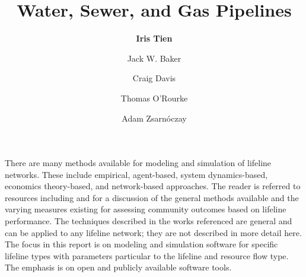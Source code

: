 %
%
%

\title{Water, Sewer, and Gas Pipelines}
\author{
    \textbf{Iris Tien}
    \and {Jack W. Baker}
    \and {Craig Davis}
    \and {Thomas O'Rourke}
    \and {Adam Zsarnóczay}}
\tocauthor{}
%
%
\maketitle

There are many methods available for modeling and simulation of lifeline networks. These include empirical, agent-based, system dynamics-based, economics theory-based, and network-based approaches. The reader is referred to resources including \cite{ouyang2014review} and \cite{johansen2017metrics} for a discussion of the general methods available and the varying measures existing for assessing community outcomes based on lifeline performance. The techniques described in the works referenced are general and can be applied to any lifeline network; they are not described in more detail here. The focus in this report is on modeling and simulation software for specific lifeline types with parameters particular to the lifeline and resource flow type. The emphasis is on open and publicly available software tools.

